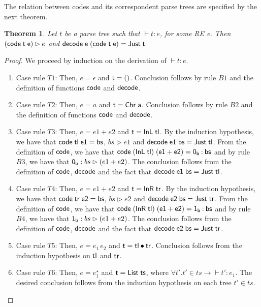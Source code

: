 \documentclass[sigplan]{acmart}
\newtheorem{Theorem}{Theorem}
\theoremstyle{definition}
\newcommand{\C}[1]{\red{\mathsf{#1}}}
\newcommand{\F}[1]{\green{\mathsf{#1}}}
\newcommand{\V}[1]{\black{\mathsf{#1}}}
\begin{document}
The relation between codes and its correspondent parse trees are specified by the next
theorem.
\begin{Theorem}
  Let $t$ be a parse tree such that $\vdash t : e$, for some RE e. Then $\ensuremath{(\F{code}\;\V{t}\;\V{e})} \rhd e$ and
  \ensuremath{\F{decode}\;\V{e}\;(\F{code}\;\V{t}\;\V{e})\mathrel{=}\C{Just}\;\V{t}}.
\end{Theorem}
\begin{proof}
  We proceed by induction on the derivation of $\vdash t : e$.
  \begin{enumerate}
    \item Case rule $T1$: Then, $e = \epsilon$ and \ensuremath{\V{t}\mathrel{=}\C{()}}. Conclusion follows by rule $B1$ and
          the definition of functions \ensuremath{\F{code}} and \ensuremath{\F{decode}}.
    \item Case rule $T2$: Then, $e = a$ and \ensuremath{\V{t}\mathrel{=}\C{Chr}\;\V{a}}. Conclusion follows by rule $B2$ and
          the definition of functions \ensuremath{\F{code}} and \ensuremath{\F{decode}}.
    \item Case rule $T3$: Then, $e = e1 + e2$ and \ensuremath{\V{t}\mathrel{=}\C{InL}\;\V{tl}}. By the induction hypothesis,
          we have that \ensuremath{\F{code}\;\V{tl}\;\V{e1}\mathrel{=}\V{bs}},  $bs \rhd e1$ and \ensuremath{\F{decode}\;\V{e1}\;\V{bs}\mathrel{=}\C{Just}\;\V{tl}}. From the
          definition of \ensuremath{\F{code}}, we have that \ensuremath{\F{code}\;(\C{InL}\;\V{tl})\;(\V{e1}\mathbin{+}\V{e2})\mathrel{=}\C{0_b}\mathbin{:}\V{bs}} and by rule $B3$,
          we have that $\ensuremath{\C{0_b}} : bs \rhd (e1 + e2)$. The conclusion follows from the definition of \ensuremath{\F{code}},
          \ensuremath{\F{decode}} and the fact that \ensuremath{\F{decode}\;\V{e1}\;\V{bs}\mathrel{=}\C{Just}\;\V{tl}}.
    \item Case rule $T4$: Then, $e = e1 + e2$ and \ensuremath{\V{t}\mathrel{=}\C{InR}\;\V{tr}}. By the induction hypothesis,
          we have that \ensuremath{\F{code}\;\V{tr}\;\V{e2}\mathrel{=}\V{bs}},  $bs \rhd e2$ and \ensuremath{\F{decode}\;\V{e2}\;\V{bs}\mathrel{=}\C{Just}\;\V{tr}}. From the
          definition of \ensuremath{\F{code}}, we have that \ensuremath{\F{code}\;(\C{InR}\;\V{tl})\;(\V{e1}\mathbin{+}\V{e2})\mathrel{=}\C{1_b}\mathbin{:}\V{bs}} and by rule $B4$,
          we have that $\ensuremath{\C{1_b}} : bs \rhd (e1 + e2)$. The conclusion follows from the definition of \ensuremath{\F{code}},
          \ensuremath{\F{decode}} and the fact that \ensuremath{\F{decode}\;\V{e2}\;\V{bs}\mathrel{=}\C{Just}\;\V{tr}}.
    \item Case rule $T5$: Then, $e = e_1\,e_2$ and \ensuremath{\V{t}\mathrel{=}\V{tl}\C{\:\bullet\:}\V{tr}}. Conclusion follows from the induction
          hypothesis on \ensuremath{\V{tl}} and \ensuremath{\V{tr}}.
    \item Case rule $T6$: Then, $e = e_1^\star$ and \ensuremath{\V{t}\mathrel{=}\C{List}\;\V{ts}},
          where $\forall t'. t' \in ts \to \vdash t' : e_1$. The desired conclusion follows from the induction hypothesis
          on each tree $t' \in ts$.
  \end{enumerate}
\end{proof}
\end{document}
